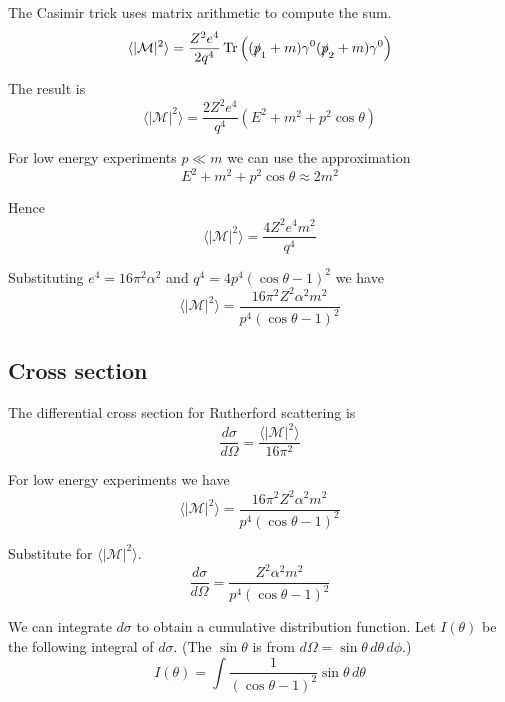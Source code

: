 \documentclass[12pt]{article}
\begin{document}
The Casimir trick uses matrix arithmetic to compute the sum.
\begin{equation*}
\langle\vert\mathcal{M}\vert^2\rangle
=\frac{Z^2e^4}{2q^4}\mathop{\rm Tr}\left((\slashed{p}_1+m)\gamma^0(\slashed{p}_2+m)\gamma^0\right)
\end{equation*}

The result is
\begin{equation*}
\langle\vert\mathcal{M}\vert^2\rangle
=\frac{2Z^2e^4}{q^4}\left(E^2+m^2+p^2\cos\theta\right)
\end{equation*}

For low energy experiments $p\ll m$ we can use the approximation
\begin{equation*}
E^2+m^2+p^2\cos\theta\approx2m^2
\end{equation*}

Hence
\begin{equation*}
\langle|\mathcal{M}|^2\rangle=\frac{4Z^2e^4m^2}{q^4}
\end{equation*}

Substituting $e^4=16\pi^2\alpha^2$ and $q^4=4p^4(\cos\theta-1)^2$ we have
\begin{equation*}
\langle|\mathcal{M}|^2\rangle=\frac{16\pi^2Z^2\alpha^2m^2}{p^4(\cos\theta-1)^2}
\end{equation*}

\subsection*{Cross section}
The differential cross section for Rutherford scattering is
\begin{equation*}
\frac{d\sigma}{d\Omega}=\frac{\langle|\mathcal{M}|^2\rangle}{16\pi^2}
\end{equation*}

For low energy experiments we have
\begin{equation*}
\langle|\mathcal{M}|^2\rangle=\frac{16\pi^2Z^2\alpha^2m^2}{p^4(\cos\theta-1)^2}
\end{equation*}

Substitute for $\langle|\mathcal{M}|^2\rangle$.
\begin{equation*}
\frac{d\sigma}{d\Omega}=\frac{Z^2\alpha^2m^2}{p^4(\cos\theta-1)^2}
\end{equation*}

We can integrate $d\sigma$ to obtain a cumulative distribution function.
Let $I(\theta)$ be the following integral of $d\sigma$.
(The $\sin\theta$ is from $d\Omega=\sin\theta\,d\theta\,d\phi$.)
\begin{equation*}
I(\theta)
=\int\frac{1}{(\cos\theta-1)^2}\sin\theta\,d\theta
\end{equation*}
\end{document}
